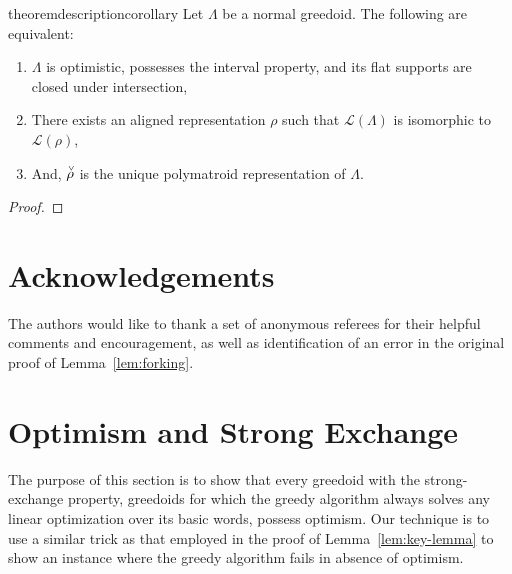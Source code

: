 \documentclass[11pt]{article}
\newcommand{\glang}{\Lambda}
\providecommand{\L}{}
\renewcommand{\L}{\mathscr{L}}
\begin{document}
\begin{restatable}{theorem}{descriptioncorollary}\label{cor:big}
    Let $\glang$ be a normal greedoid.
    The following are equivalent:
    \begin{enumerate}
        \item $\glang$ is optimistic, possesses the interval property, and its flat supports are closed under intersection,
        \item There exists an aligned representation $\rho$ such that $\L(\glang)$ is isomorphic to $\L(\rho)$,
        \item And, $\accentset{\vee}{\rho}$ is the unique polymatroid representation of $\glang$.
    \end{enumerate} 
\end{restatable}
\begin{proof}
\end{proof}
\fi

\section*{Acknowledgements}
The authors would like to thank a set of anonymous referees for their helpful comments and encouragement, as well as identification of an error in the original proof of Lemma~\ref{lem:forking}.
\printbibliography
\newpage

\appendix

\section{Optimism and Strong Exchange}\label{app:optimism}

The purpose of this section is to show that every greedoid with the strong-exchange property, greedoids for which the greedy algorithm always solves any linear optimization over its basic words, possess optimism.
Our technique is to use a similar trick as that employed in the proof of Lemma~\ref{lem:key-lemma} to show an instance where the greedy algorithm fails in absence of optimism.
\end{document}
